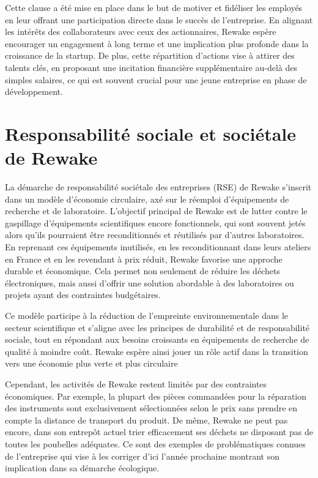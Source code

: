 \documentclass{rapportENSCP}
\begin{document}
Cette clause a été mise en place dans le but de motiver et fidéliser les employés en leur offrant une participation directe dans le succès de l'entreprise. En alignant les intérêts des collaborateurs avec ceux des actionnaires, Rewake espère encourager un engagement à long terme et une implication plus profonde dans la croissance de la startup. De plus, cette répartition d'actions vise à attirer des talents clés, en proposant une incitation financière supplémentaire au-delà des simples salaires, ce qui est souvent crucial pour une jeune entreprise en phase de développement.

\section{Responsabilité sociale et sociétale de Rewake}
La démarche de responsabilité sociétale des entreprises (RSE) de Rewake s'inscrit dans un modèle d'économie circulaire, axé sur le réemploi d'équipements de recherche et de laboratoire. L'objectif principal de Rewake est de lutter contre le gaspillage d'équipements scientifiques encore fonctionnels, qui sont souvent jetés alors qu'ils pourraient être reconditionnés et réutilisés par d'autres laboratoires. En reprenant ces équipements inutilisés, en les reconditionnant dans leurs ateliers en France et en les revendant à prix réduit, Rewake favorise une approche durable et économique. Cela permet non seulement de réduire les déchets électroniques, mais aussi d'offrir une solution abordable à des laboratoires ou projets ayant des contraintes budgétaires.

Ce modèle participe à la réduction de l'empreinte environnementale dans le secteur scientifique et s'aligne avec les principes de durabilité et de responsabilité sociale, tout en répondant aux besoins croissants en équipements de recherche de qualité à moindre coût. Rewake espère ainsi jouer un rôle actif dans la transition vers une économie plus verte et plus circulaire

Cependant, les activités de Rewake restent limités par des contraintes économiques. Par exemple, la plupart des pièces commandées pour la réparation des instruments sont exclusivement sélectionnées selon le prix sans prendre en compte la distance de transport du produit. De même, Rewake ne peut pas encore, dans son entrepôt actuel trier efficacement ses déchets ne disposant pas de toutes les poubelles adéquates. Ce sont des exemples de problématiques connues de l'entreprise qui vise à les corriger d'ici l'année prochaine montrant son implication dans sa démarche écologique.
\end{document}
